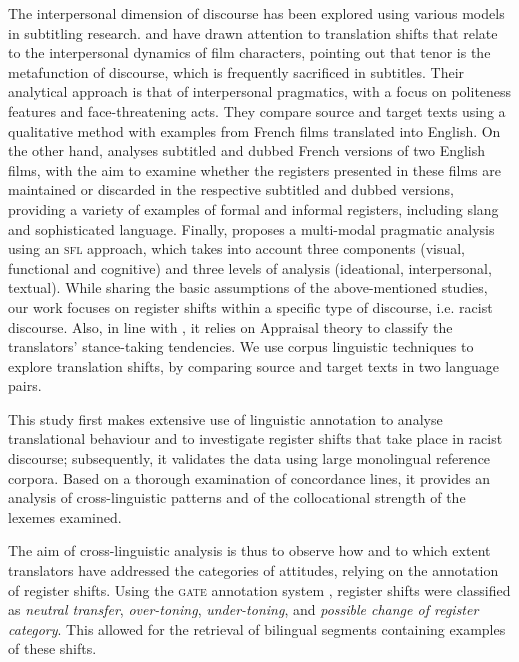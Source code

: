 \documentclass[output=paper]{LSP/langsci}
\begin{document}
The interpersonal dimension of discourse has been explored using various models in subtitling research. \citet[78--96]{Hatim1997} and \citet{Mason2001} have drawn attention to translation shifts that relate to the interpersonal dynamics of film characters, pointing out that tenor is the metafunction of discourse, which is frequently sacrificed in subtitles. Their analytical approach is that of interpersonal pragmatics, with a focus on politeness features and face-threatening acts. They compare source and target texts using a qualitative method with examples from French films translated into English. On the other hand, \citet{Pettit2005} analyses subtitled and dubbed French versions of two English films, with the aim to examine whether the registers presented in these films are maintained or discarded in the respective subtitled and dubbed versions, providing a variety of examples of formal and informal registers, including slang and sophisticated language. Finally, \citet{Mubenga2009} proposes a multi-modal pragmatic analysis using an \textsc{sfl} approach, which takes into account three components (visual, functional and cognitive) and three levels of analysis (ideational, interpersonal, textual). While sharing the basic assumptions of the above-mentioned studies, our work focuses on register shifts within a specific type of discourse, i.e. racist discourse. Also, in line with \citet{Munday2012}, it relies on Appraisal theory to classify the translators' stance-taking tendencies. We use corpus linguistic techniques to explore translation shifts, by comparing source and target texts in two language pairs.

This study first makes extensive use of linguistic annotation to analyse translational behaviour and to investigate register shifts that take place in racist discourse; subsequently, it validates the data using large monolingual reference corpora. Based on a thorough examination of concordance lines, it provides an analysis of cross-linguistic patterns and of the collocational strength of the lexemes examined.

The aim of cross-linguistic analysis is thus to observe how and to which extent translators have addressed the categories of attitudes, relying on the annotation of register shifts. Using the \textsc{gate} annotation system \citep{Cunningham2002}, register shifts were classified as \textit{neutral transfer}, \textit{over-toning}, \textit{under-toning}, and \textit{possible change of register category}. This allowed for the retrieval of bilingual segments containing examples of these shifts.
\end{document}
